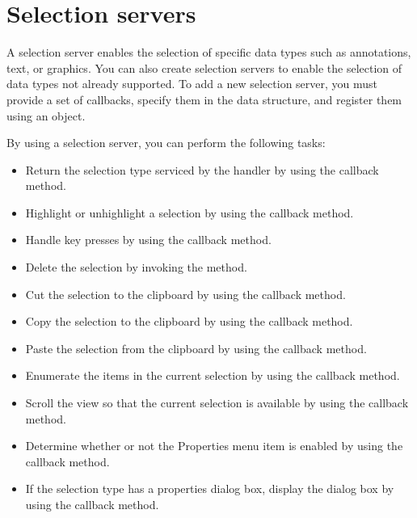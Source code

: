 \documentclass[letterpaper,12pt,english,openany,oneside]{sphinxmanual}
\begin{document}
\section{Selection servers}
\label{\detokenize{Plugins_Handlers:selection-servers}}
A selection server enables the selection of specific data types such as annotations, text, or graphics. You can also create selection servers to enable the selection of data types not already supported. To add a new selection server, you must provide a set of callbacks, specify them in the  data structure, and register them using an  object.

By using a selection server, you can perform the following tasks:
\begin{itemize}
\item {} 
Return the selection type serviced by the handler by using the  callback method.

\item {} 
Highlight or unhighlight a selection by using the  callback method.

\item {} 
Handle key presses by using the  callback method.

\item {} 
Delete the selection by invoking the  method.

\item {} 
Cut the selection to the clipboard by using the  callback method.

\item {} 
Copy the selection to the clipboard by using the  callback method.

\item {} 
Paste the selection from the clipboard by using the  callback method.

\item {} 
Enumerate the items in the current selection by using the  callback method.

\item {} 
Scroll the view so that the current selection is available by using the  callback method.

\item {} 
Determine whether or not the Properties menu item is enabled by using the  callback method.

\item {} 
If the selection type has a properties dialog box, display the dialog box by using the  callback method.

\end{itemize}
\end{document}
